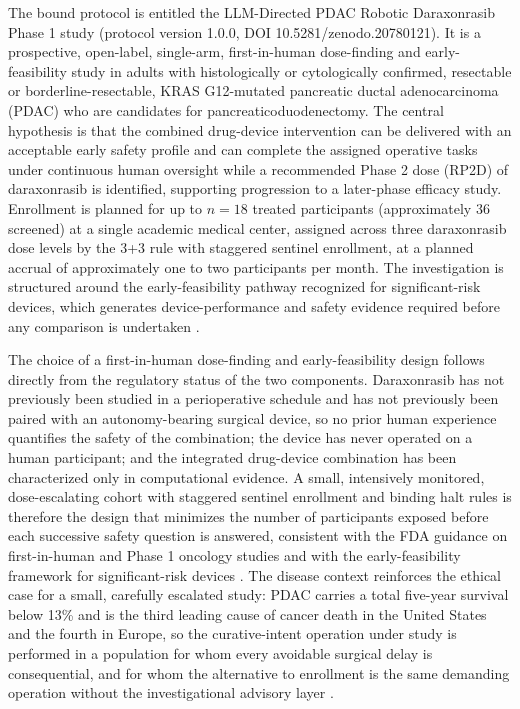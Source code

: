 The bound protocol is entitled the LLM-Directed PDAC Robotic Daraxonrasib Phase 1
study (protocol version 1.0.0, DOI 10.5281/zenodo.20780121). It is a prospective,
open-label, single-arm, first-in-human dose-finding and early-feasibility study in
adults with histologically or cytologically confirmed, resectable or
borderline-resectable, KRAS G12-mutated pancreatic ductal adenocarcinoma (PDAC)
who are candidates for pancreaticoduodenectomy. The central hypothesis is that the
combined drug-device intervention can be delivered with an acceptable early safety
profile and can complete the assigned operative tasks under continuous human
oversight while a recommended Phase 2 dose (RP2D) of daraxonrasib is identified,
supporting progression to a later-phase efficacy study. Enrollment is planned for
up to $n=18$ treated participants (approximately 36 screened) at a single academic
medical center, assigned across three daraxonrasib dose levels by the 3+3 rule
with staggered sentinel enrollment, at a planned accrual of approximately one to
two participants per month. The investigation is structured around the
early-feasibility pathway recognized for significant-risk devices, which generates device-performance and safety evidence required before any
comparison is undertaken \cite{phase1guidance,daraxwhipple}.

The choice of a first-in-human dose-finding and early-feasibility design follows
directly from the regulatory status of the two components. Daraxonrasib has not
previously been studied in a perioperative schedule and has not previously been
paired with an autonomy-bearing surgical device, so no prior human experience
quantifies the safety of the combination; the device has never operated on a human
participant; and the integrated drug-device combination has been characterized only
in computational evidence. A small, intensively monitored, dose-escalating cohort
with staggered sentinel enrollment and binding halt rules is therefore the design
that minimizes the number of participants exposed before each successive safety
question is answered, consistent with the FDA guidance on first-in-human and Phase 1
oncology studies and with the early-feasibility framework for significant-risk
devices \cite{phase1guidance,oncotrialllm}. The disease context reinforces the
ethical case for a small, carefully escalated study: PDAC carries a total five-year
survival below 13\% and is the third leading cause of cancer death in the United
States and the fourth in Europe, so the curative-intent operation under study is
performed in a population for whom every avoidable surgical delay is consequential,
and for whom the alternative to enrollment is the same demanding operation without
the investigational advisory layer \cite{pdac060s2030}.


